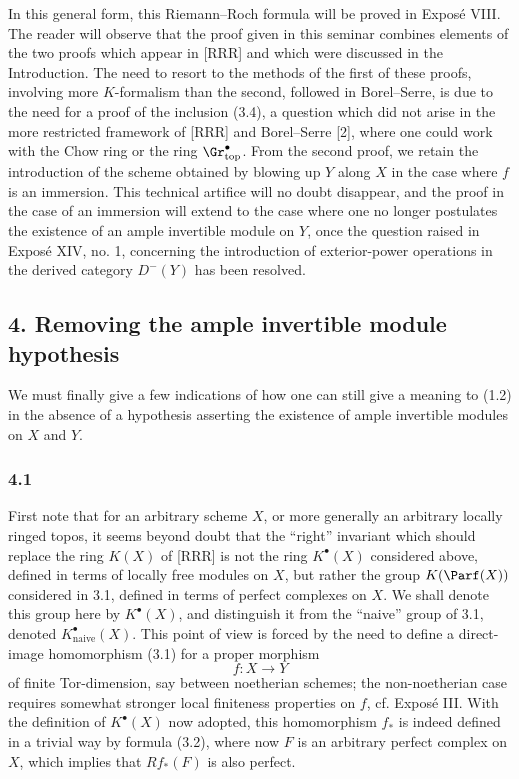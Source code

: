 In this general form, this Riemann--Roch formula will be proved in Expos\'e VIII. The reader will observe that the proof given in this seminar combines elements of the two proofs which appear in [RRR] and which were discussed in the Introduction. The need to resort to the methods of the first of these proofs, involving more $K$-formalism than the second, followed in Borel--Serre, is due to the need for a proof of the inclusion (3.4), a question which did not arise in the more restricted framework of [RRR] and Borel--Serre [2], where one could work with the Chow ring or the ring $\Gr^\bullet_{\mathrm{top}}$. From the second proof, we retain the introduction of the scheme obtained by blowing up $Y$ along $X$ in the case where $f$ is an immersion. This technical artifice will no doubt disappear, and the proof in the case of an immersion will extend to the case where one no longer postulates the existence of an ample invertible module on $Y$, once the question raised in Expos\'e XIV, no. 1, concerning the introduction of exterior-power operations in the derived category $D^-(Y)$ has been resolved.

\subsection*{4. Removing the ample invertible module hypothesis}
We must finally give a few indications of how one can still give a meaning to (1.2) in the absence of a hypothesis asserting the existence of ample invertible modules on $X$ and $Y$.

\subsubsection*{4.1}
First note that for an arbitrary scheme $X$, or more generally an arbitrary locally ringed topos, it seems beyond doubt that the ``right'' invariant which should replace the ring $K(X)$ of [RRR] is not the ring $K^\bullet(X)$ considered above, defined in terms of locally free modules on $X$, but rather the group $K(\Parf(X))$ considered in 3.1, defined in terms of perfect complexes on $X$. We shall denote this group here by $K^\bullet(X)$, and distinguish it from the ``naive'' group of 3.1, denoted $K^\bullet_{\mathrm{naive}}(X)$. This point of view is forced by the need to define a direct-image homomorphism (3.1) for a proper morphism
\[
f:X\longrightarrow Y
\]
of finite Tor-dimension, say between noetherian schemes; the non-noetherian case requires somewhat stronger local finiteness properties on $f$, cf. Expos\'e III. With the definition of $K^\bullet(X)$ now adopted, this homomorphism $f_*$ is indeed defined in a trivial way by formula (3.2), where now $F$ is an arbitrary perfect complex on $X$, which implies that $Rf_*(F)$ is also perfect.

